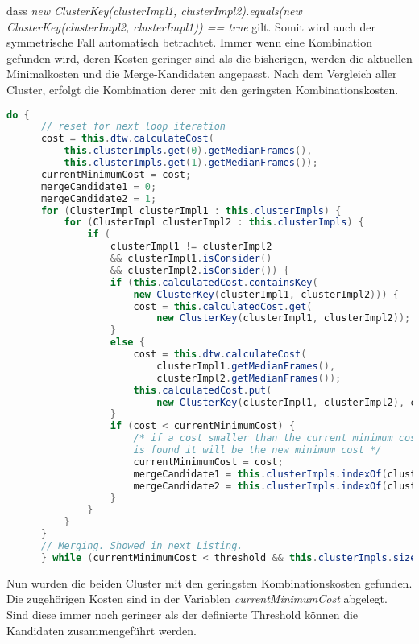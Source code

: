 dass \emph{new ClusterKey(clusterImpl1, clusterImpl2).equals(new ClusterKey(clusterImpl2, clusterImpl1)) == true} gilt.
Somit wird auch der symmetrische Fall automatisch betrachtet.
Immer wenn eine Kombination gefunden wird, deren Kosten geringer sind als die bisherigen,
werden die aktuellen Minimalkosten und die Merge-Kandidaten angepasst.
Nach dem Vergleich aller Cluster, erfolgt die Kombination derer mit den geringsten Kombinationskosten.
\begin{lstlisting}[language=Java, caption=Cluster-Methode: Berechnungsvorgang.]
  do {
      // reset for next loop iteration
      cost = this.dtw.calculateCost(    
          this.clusterImpls.get(0).getMedianFrames(),
          this.clusterImpls.get(1).getMedianFrames());
      currentMinimumCost = cost;
      mergeCandidate1 = 0;
      mergeCandidate2 = 1;
      for (ClusterImpl clusterImpl1 : this.clusterImpls) {
          for (ClusterImpl clusterImpl2 : this.clusterImpls) {
              if (
                  clusterImpl1 != clusterImpl2
                  && clusterImpl1.isConsider()
                  && clusterImpl2.isConsider()) {
                  if (this.calculatedCost.containsKey(
                      new ClusterKey(clusterImpl1, clusterImpl2))) {
                      cost = this.calculatedCost.get(
                          new ClusterKey(clusterImpl1, clusterImpl2));
                  }
                  else {
                      cost = this.dtw.calculateCost(
                          clusterImpl1.getMedianFrames(),
                          clusterImpl2.getMedianFrames());
                      this.calculatedCost.put(
                          new ClusterKey(clusterImpl1, clusterImpl2), cost);
                  }
                  if (cost < currentMinimumCost) {
                      /* if a cost smaller than the current minimum cost
                      is found it will be the new minimum cost */
                      currentMinimumCost = cost;
                      mergeCandidate1 = this.clusterImpls.indexOf(clusterImpl1);
                      mergeCandidate2 = this.clusterImpls.indexOf(clusterImpl2);
                  }
              }
          }
      }
      // Merging. Showed in next Listing.
      } while (currentMinimumCost < threshold && this.clusterImpls.size() > 1);
\end{lstlisting}
Nun wurden die beiden Cluster mit den geringsten Kombinationskosten gefunden.
Die zugehörigen Kosten sind in der Variablen \emph{currentMinimumCost} abgelegt.
Sind diese immer noch geringer als der definierte Threshold können die Kandidaten zusammengeführt werden.
